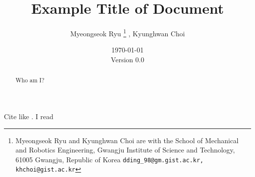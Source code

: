 \documentclass{article}
\title{
    Example Title of Document
}
\author{
    Myeongseok Ryu
    \thanks{Myeongseok Ryu and Kyunghwan Choi are with the School of Mechanical and Robotics Engineering, Gwangju Institute of Science and Technology, 61005 Gwangju, Republic of Korea {\tt\small dding\_98@gm.gist.ac.kr, khchoi@gist.ac.kr}}%
    ,
    Kyunghwan Choi
    \footnotemark[1]
}
\date{
    \today
    \\
    Version 0.0
}
\newcommand*{\template}{../template}
\begin{document}
\maketitle

\begin{abstract}
    Who am I?
\end{abstract}

\tableofcontents



Cite like \cite{Khalil:2002aa}.
I read \cite{MPC2009}





\begin{appendices}

\end{appendices}



\end{document}
